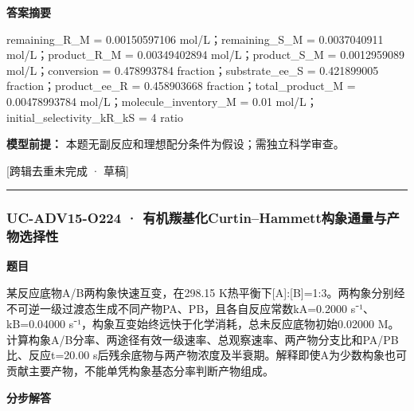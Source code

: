 \documentclass[UTF8,11pt,a4paper]{ctexart}
\begin{document}
\noindent\textbf{答案摘要}\par
remaining\_R\_M = 0.00150597106 mol/L；remaining\_S\_M = 0.0037040911 mol/L；product\_R\_M = 0.00349402894 mol/L；product\_S\_M = 0.0012959089 mol/L；conversion = 0.478993784 fraction；substrate\_ee\_S = 0.421899005 fraction；product\_ee\_R = 0.458903668 fraction；total\_product\_M = 0.00478993784 mol/L；molecule\_inventory\_M = 0.01 mol/L；initial\_selectivity\_kR\_kS = 4 ratio\par
\noindent\textbf{模型前提：}
本题无副反应和理想配分条件为假设；需独立科学审查。\par
\noindent\textcolor{red!65!black}{[跨辑去重未完成 · 草稿]} \par
\medskip\hrule\medskip
{}
\subsubsection*{UC-ADV15-O224 · 有机羰基化Curtin–Hammett构象通量与产物选择性}
\noindent\textbf{题目}\par
某反应底物A/B两构象快速互变，在298.15 K热平衡下[A]:[B]=1:3。两构象分别经不可逆一级过渡态生成不同产物PA、PB，且各自反应常数kA=0.2000 s⁻¹、kB=0.04000 s⁻¹，构象互变始终远快于化学消耗，总未反应底物初始0.02000 M。计算构象A/B分率、两途径有效一级速率、总观察速率、两产物分支比和PA/PB比、反应t=20.00 s后残余底物与两产物浓度及半衰期。解释即使A为少数构象也可贡献主要产物，不能单凭构象基态分率判断产物组成。\par
\medskip\noindent\textbf{分步解答}
\end{document}
